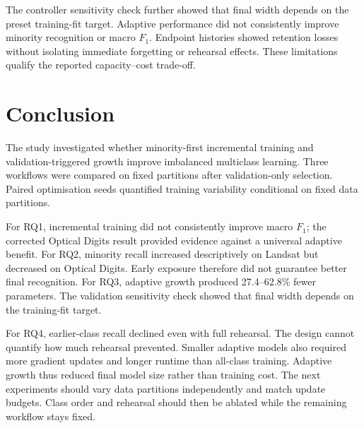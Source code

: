 \documentclass[conference,10pt]{IEEEtran}
\begin{document}
The controller sensitivity check further showed that final width depends on the preset training-fit target. Adaptive performance did not consistently improve minority recognition or macro $F_1$. Endpoint histories showed retention losses without isolating immediate forgetting or rehearsal effects. These limitations qualify the reported capacity--cost trade-off.

\section{Conclusion}

The study investigated whether minority-first incremental training and validation-triggered growth improve imbalanced multiclass learning. Three workflows were compared on fixed partitions after validation-only selection. Paired optimisation seeds quantified training variability conditional on fixed data partitions.

For RQ1, incremental training did not consistently improve macro $F_1$; the corrected Optical Digits result provided evidence against a universal adaptive benefit. For RQ2, minority recall increased descriptively on Landsat but decreased on Optical Digits. Early exposure therefore did not guarantee better final recognition. For RQ3, adaptive growth produced 27.4--62.8\% fewer parameters. The validation sensitivity check showed that final width depends on the training-fit target.

For RQ4, earlier-class recall declined even with full rehearsal. The design cannot quantify how much rehearsal prevented. Smaller adaptive models also required more gradient updates and longer runtime than all-class training. Adaptive growth thus reduced final model size rather than training cost. The next experiments should vary data partitions independently and match update budgets. Class order and rehearsal should then be ablated while the remaining workflow stays fixed.
\end{document}
